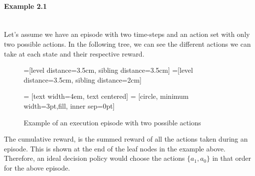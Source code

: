 \paragraph{Example 2.1}\mbox{}\\
Let's assume we have an episode with two time-steps and an action set with only two possible actions. In the following tree, we can see the different actions we can take at each state and their respective reward.\\
\begin{figure}[h]
=[level distance=3.5cm, sibling distance=3.5cm]
=[level distance=3.5cm, sibling distance=2cm]

 = [text width=4em, text centered]
 = [circle, minimum width=3pt,fill, inner sep=0pt]

\begin{center}
	
\caption{Example of an execution episode with two possible actions}
\end{center}
\end{figure}

The cumulative reward, is the summed reward of all the actions taken during an episode. This is shown at the end of the leaf nodes in the example above. Therefore, an ideal decision policy would choose the actions $\{a_1,a_0\}$ in that order for the above episode.
